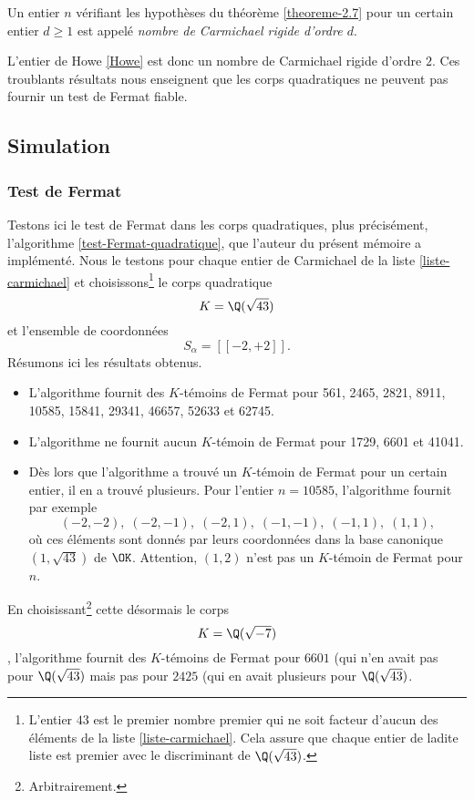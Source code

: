 \begin{definition}
	Un entier $n$ vérifiant les hypothèses du théorème \ref{theoreme-2.7} pour un certain entier $d\geq 1$ est appelé \emph{nombre de Carmichael rigide d'ordre $d$}.
\end{definition}

L'entier de Howe \ref{Howe} est donc un nombre de Carmichael rigide d'ordre $2$. Ces troublants résultats nous enseignent que les corps quadratiques ne peuvent pas fournir un test de Fermat fiable. 

\subsection{Simulation}

\subsubsection{Test de Fermat}

Testons ici le test de Fermat dans les corps quadratiques, plus précisément, l'algorithme \ref{test-Fermat-quadratique}, que l'auteur du présent mémoire a implémenté. Nous le testons pour chaque entier de Carmichael de la liste \ref{liste-carmichael} et choisissons\footnote{L'entier $43$ est le premier nombre premier qui ne soit facteur d'aucun des éléments de la liste \ref{liste-carmichael}. Cela assure que chaque entier de ladite liste est premier avec le discriminant de $\Q(\sqrt{43})$.} le corps quadratique \[K = \Q(\sqrt{43})\] et l'ensemble de coordonnées \[S_\alpha = [\![-2, +2]\!].\] Résumons ici les résultats obtenus.
\begin{itemize}
	\item L'algorithme fournit des $K$-témoins de Fermat pour 561, 2465, 2821, 8911, 10585, 15841, 29341, 46657, 52633 et 62745.
	\item L'algorithme ne fournit aucun $K$-témoin de Fermat pour 1729, 6601 et 41041.
	\item Dès lors que l'algorithme a trouvé un $K$-témoin de Fermat pour un certain entier, il en a trouvé plusieurs. Pour l'entier $n = 10585$, l'algorithme fournit par exemple \[(-2, -2), \; (-2, -1), \; (-2, 1), \; (-1, -1), \; (-1, 1), \; (1, 1),\] où ces éléments sont donnés par leurs coordonnées dans la base canonique $(1, \sqrt{43})$ de $\OK$. Attention, $(1, 2)$ n'est pas un $K$-témoin de Fermat pour $n$.
\end{itemize}

En choisissant\footnote{Arbitrairement.} cette désormais le corps \[K = \Q(\sqrt{-7})\], l'algorithme fournit des $K$-témoins de Fermat pour $6601$ (qui n'en avait pas pour $\Q(\sqrt{43})$ mais pas pour $2425$ (qui en avait plusieurs pour $\Q(\sqrt{43})$. \\

